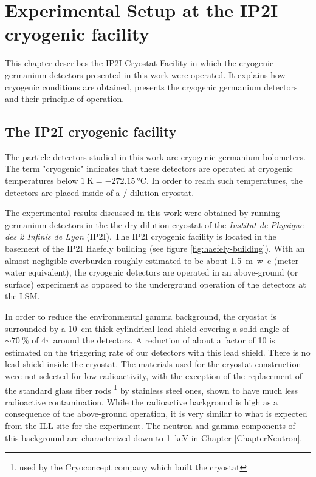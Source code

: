 
\chapter{Experimental Setup at the IP2I cryogenic facility} %

\label{ChapterExperiment} %


This chapter describes the IP2I Cryostat Facility in which the cryogenic germanium detectors presented in this work were operated. It explains how cryogenic conditions are obtained, presents the cryogenic germanium detectors and their principle of operation.

\section{The IP2I cryogenic facility}
\label{sec:IP2I-cryostat-facility} 

The particle detectors studied in this work are cryogenic germanium bolometers. The term "cryogenic" indicates that these detectors are operated at cryogenic temperatures below $\SI{1}{\kelvin} = \SI{-272,15}{\celsius}$. In order to reach such temperatures, the detectors are placed inside of a / dilution cryostat.

The experimental results discussed in this work were obtained by running germanium detectors in the the dry dilution cryostat of the \textit{Institut de Physique des 2 Infinis de Lyon} (IP2I). The IP2I cryogenic facility is located in the basement of the IP2I Haefely building (see figure \ref{fig:haefely-building}). With an almost negligible overburden roughly estimated to be about \SI{1.5}{m.w.e} (meter water equivalent), the cryogenic detectors are operated in an above-ground (or surface) experiment as opposed to the underground operation of the \Edelweiss{} detectors at the LSM.

In order to reduce the environmental gamma background, the cryostat is surrounded by a \SI{10}{\cm} thick cylindrical lead shield covering a solid angle of $\sim \SI{70}{\percent}$ of $4\pi$ around the detectors. A reduction of about a factor of 10 is estimated on the triggering rate of our detectors with this lead shield.
There is no lead shield inside the cryostat. The materials used for the cryostat construction were not selected for low radioactivity, with the exception of the replacement of the standard glass fiber rods \footnote{used by the Cryoconcept company which built the cryostat} by stainless steel ones, shown to have much less radioactive contamination. 
While the radioactive background is high as a consequence of the above-ground operation, it is very similar to what is expected from the ILL site for the \Ricochet{} experiment. The neutron and gamma components of this background are characterized down to \SI{1}{\kilo\eV} in Chapter \ref{ChapterNeutron}.

